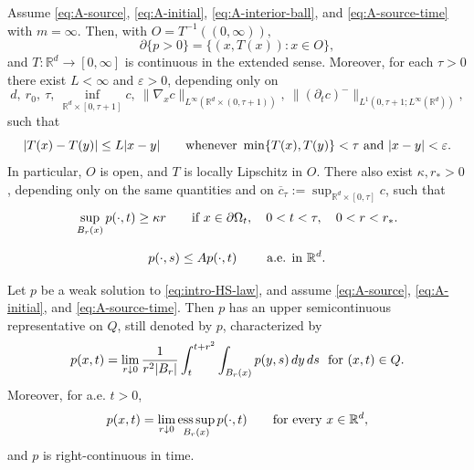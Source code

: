 \documentclass[10pt,a4paper]{amsart}
\def\R{\mathbb{R}}
\newcommand{\abs}[1]{\lvert #1 \rvert}
\newcommand{\norm}[1]{\lVert #1 \rVert}
\newcommand{\vep}{\varepsilon}
\begin{document}
\begin{thm}\label{thm:HS-hitting-time-lipschitz}
Assume \eqref{eq:A-source}, \eqref{eq:A-initial}, \eqref{eq:A-interior-ball}, and \eqref{eq:A-source-time} with $m=\infty$. Then, with $O=T^{-1}((0,\infty)),$
\[
    \partial\{p>0\} =\{(x,T(x)):x\in O\},
\]
and $T:\R^d\to[0,\infty]$ is continuous in the extended sense. Moreover, for each $\tau>0$
there exist $L<\infty$ and $\vep>0$, depending only on
\[
    d,\ r_0,\ \tau,\ \inf_{\R^d\times[0,\tau+1]}c,\
    \norm{\nabla_xc}_{L^\infty(\R^d\times(0,\tau+1))},\
    \norm{(\partial_tc)^-}_{L^1(0,\tau+1;L^\infty(\R^d))},
\]
such that
\begin{equation}\label{eq:HS-T-local-Lipschitz-estimate}
    \abs{T(x)-T(y)}\leq L\abs{x-y}
    \qquad\hbox{whenever }\min\{T(x),T(y)\}<\tau\hbox{ and }\abs{x-y}<\vep .
\end{equation}
In particular, $O$ is open, and $T$ is locally Lipschitz in $O$.
There also exist $\kappa,r_*>0$, depending only on the same quantities and on
$\overline c_\tau:=\sup_{\R^d\times[0,\tau]}c$, such that
\begin{equation}\label{eq:HS-pressure-linear-nondegeneracy}
    \sup_{B_r(x)}p(\cdot,t)\geq\kappa r
    \qquad\hbox{if }x\in\partial\Omega_t,\quad 0<t<\tau,\quad 0<r<r_*.
\end{equation}

\end{thm}

\begin{equation}\label{eq:HS-slice-pressure-comparison}
    p(\cdot,s)\leq Ap(\cdot,t)
    \qquad\hbox{ a.e. in  } \R^d .
\end{equation}

\begin{prop}\label{prop:HS-USC-representative}
Let \(p\) be a weak solution to \eqref{eq:intro-HS-law}, and assume
\eqref{eq:A-source}, \eqref{eq:A-initial}, and \eqref{eq:A-source-time}.
Then \(p\) has an
upper semicontinuous representative on $Q$, still denoted
by \(p\), characterized by
\begin{equation}\label{eq:HS-forward-average-representative}
    p(x,t)=\lim_{r\downarrow0}
    \frac{1}{r^2\abs{B_r}}
    \int_t^{t+r^2}\int_{B_r(x)}p(y,s)\,dy\,ds  \,\, \hbox{ for } (x,t)\in Q.
\end{equation}
Moreover, for a.e. \(t>0\),
\begin{equation}\label{eq:HS-spatial-envelope-representative}
    p(x,t)=
    \lim_{r\downarrow0}
    \operatorname*{ess\,sup}_{B_r(x)}p(\cdot,t)
    \qquad\hbox{for every }x\in\R^d,
\end{equation}
and \(p\) is right-continuous in time.
\end{prop}
\end{document}
